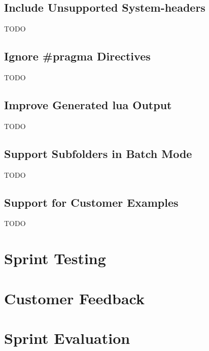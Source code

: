 \subsection{Include Unsupported System-\glspl{header}}
TODO

\subsection{Ignore \#pragma Directives}
TODO

\subsection{Improve Generated \Gls{lua} Output}
TODO

\subsection{Support Subfolders in Batch Mode}
TODO

\subsection{Support for Customer Examples}
TODO

\section{Sprint Testing}


\section{Customer Feedback}


\section{Sprint Evaluation}


